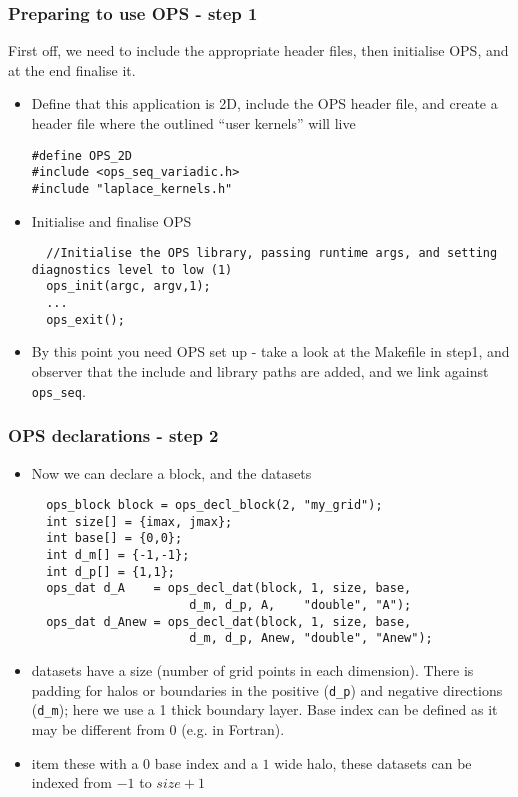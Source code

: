 \documentclass{beamer}
\begin{document}
\begin{frame}[fragile]
\frametitle{Preparing to use OPS - step 1}
First off, we need to include the appropriate header files, then initialise OPS, and at the end finalise it.
\begin{itemize}
\item Define that this application is 2D, include the OPS header file, and create a header file where the outlined ``user kernels'' will live
\begin{lstlisting}
#define OPS_2D
#include <ops_seq_variadic.h>
#include "laplace_kernels.h"
\end{lstlisting}
\item Initialise and finalise OPS
\begin{lstlisting}
  //Initialise the OPS library, passing runtime args, and setting diagnostics level to low (1)
  ops_init(argc, argv,1);
  ...
  ops_exit();
\end{lstlisting}
\item By this point you need OPS set up - take a look at the Makefile in step1, and observer that the include and library paths are added, and we link against \texttt{ops\_seq}.
\end{itemize}
\end{frame}


\begin{frame}[fragile]
\frametitle{OPS declarations - step 2}
\begin{itemize}
\item Now we can declare a block, and the datasets
\begin{lstlisting}
  ops_block block = ops_decl_block(2, "my_grid");
  int size[] = {imax, jmax};
  int base[] = {0,0};
  int d_m[] = {-1,-1};
  int d_p[] = {1,1};
  ops_dat d_A    = ops_decl_dat(block, 1, size, base,
                      d_m, d_p, A,    "double", "A");
  ops_dat d_Anew = ops_decl_dat(block, 1, size, base,
                      d_m, d_p, Anew, "double", "Anew");
  \end{lstlisting}
  \item datasets have a size (number of grid points in each dimension). There is padding for halos or boundaries in the positive (\texttt{d\_p}) and negative directions (\texttt{d\_m}); here we use a 1 thick boundary layer. Base index can be defined as it may be different from 0 (e.g. in Fortran). 
  \item item these with a $0$ base index and a $1$ wide halo, these datasets can be indexed from $-1$ to $size+1$
\end{itemize}
\end{frame}
\end{document}
